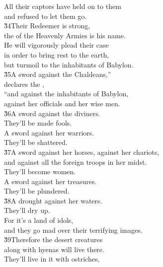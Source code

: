 \begin{poetry}
\poeml All their captors have held on to them \\
\poemll    and refused to let them go. \\
\poeml \v{34}Their Redeemer is strong, \\
\poemll    the  of the Heavenly Armies is his name. \\
\poeml He will vigorously plead their case \\
\poemll    in order to bring rest to the earth, \\
\poemlll       but turmoil to the inhabitants of Babylon. \\
\poeml \v{35}A sword against the Chaldeans,'' \\
\poemll    declares the , \\
\poeml ``and against the inhabitants of Babylon, \\
\poemll    against her officials and her wise men. \\
\poeml \v{36}A sword against the diviners. \\
\poemll    They'll be made fools. \\
\poeml A sword against her warriors. \\
\poemll    They'll be shattered. \\
\poeml \v{37}A sword against her horses, against her chariots, \\
\poemll    and against all the foreign troops in her midst. \\
\poeml They'll become women. \\
\poemll    A sword against her treasures. \\
\poemll    They'll be plundered. \\
\poeml \v{38}A drought against her waters. \\
\poemll    They'll dry up. \\
\poeml For it's a land of idols, \\
\poemll    and they go mad over their terrifying images. \\
\poeml \v{39}Therefore the desert creatures \\
\poemll    along with hyenas will live there. \\
\poeml They'll live in it with ostriches, \\

\end{poetry}
